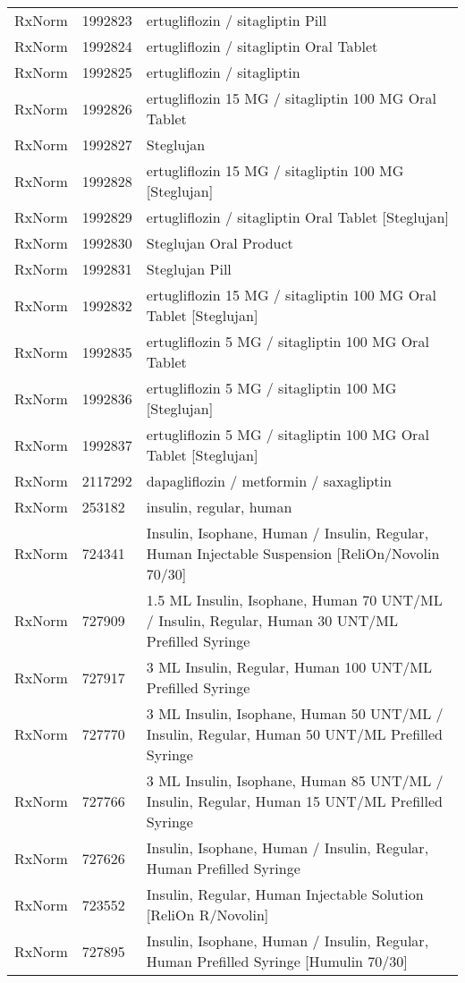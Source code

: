 \begin{longtable}{p{}p{}p{}}
  RxNorm & 1992823 & ertugliflozin / sitagliptin Pill \\ 
  RxNorm & 1992824 & ertugliflozin / sitagliptin Oral Tablet \\ 
  RxNorm & 1992825 & ertugliflozin / sitagliptin \\ 
  RxNorm & 1992826 & ertugliflozin 15 MG / sitagliptin 100 MG Oral Tablet \\ 
  RxNorm & 1992827 & Steglujan \\ 
  RxNorm & 1992828 & ertugliflozin 15 MG / sitagliptin 100 MG [Steglujan] \\ 
  RxNorm & 1992829 & ertugliflozin / sitagliptin Oral Tablet [Steglujan] \\ 
  RxNorm & 1992830 & Steglujan Oral Product \\ 
  RxNorm & 1992831 & Steglujan Pill \\ 
  RxNorm & 1992832 & ertugliflozin 15 MG / sitagliptin 100 MG Oral Tablet [Steglujan] \\ 
  RxNorm & 1992835 & ertugliflozin 5 MG / sitagliptin 100 MG Oral Tablet \\ 
  RxNorm & 1992836 & ertugliflozin 5 MG / sitagliptin 100 MG [Steglujan] \\ 
  RxNorm & 1992837 & ertugliflozin 5 MG / sitagliptin 100 MG Oral Tablet [Steglujan] \\ 
  RxNorm & 2117292 & dapagliflozin / metformin / saxagliptin \\ 
  RxNorm & 253182 & insulin, regular, human \\ 
  RxNorm & 724341 & Insulin, Isophane, Human / Insulin, Regular, Human Injectable Suspension [ReliOn/Novolin 70/30] \\ 
  RxNorm & 727909 & 1.5 ML Insulin, Isophane, Human 70 UNT/ML / Insulin, Regular, Human 30 UNT/ML Prefilled Syringe \\ 
  RxNorm & 727917 & 3 ML Insulin, Regular, Human 100 UNT/ML Prefilled Syringe \\ 
  RxNorm & 727770 & 3 ML Insulin, Isophane, Human 50 UNT/ML / Insulin, Regular, Human 50 UNT/ML Prefilled Syringe \\ 
  RxNorm & 727766 & 3 ML Insulin, Isophane, Human 85 UNT/ML / Insulin, Regular, Human 15 UNT/ML Prefilled Syringe \\ 
  RxNorm & 727626 & Insulin, Isophane, Human / Insulin, Regular, Human Prefilled Syringe \\ 
  RxNorm & 723552 & Insulin, Regular, Human Injectable Solution [ReliOn R/Novolin] \\ 
  RxNorm & 727895 & Insulin, Isophane, Human / Insulin, Regular, Human Prefilled Syringe [Humulin 70/30] \\ 

\end{longtable}
